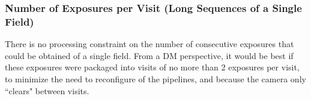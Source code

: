 \documentclass[DM,lsstdoc,toc]{lsstdoc}
\begin{document}

\subsubsection{Number of Exposures per Visit (Long Sequences of a Single Field)}

There is no processing constraint on the number of consecutive exposures that could be obtained of a single field. From a DM perspective, it would be best if these exposures were packaged into visits of no more than 2 exposures per visit, to minimize the need to reconfigure of the pipelines, and because the camera only ``clears" between visits. 

\end{document}
